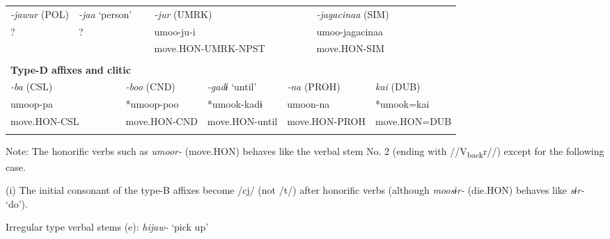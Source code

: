 \begin{tabularx}{\textwidth}{XXXXXXXXXXXXXXXXXXXX}
{ \textit{{}-jawur} (POL)} & \multicolumn{4}{X}{{ \textit{{}-jaa} ‘person’}} & \multicolumn{6}{X}{{ \textit{{}-jur} (UMRK)}} & \multicolumn{9}{X}{{ \textit{{}-jagacinaa} (SIM)}}\\
{ ?} & \multicolumn{4}{X}{?} & \multicolumn{6}{X}{umoo-ju-i} & \multicolumn{9}{X}{{ umoo-jagacinaa}}\\
& \multicolumn{4}{X}{} & \multicolumn{6}{X}{move.HON-UMRK-NPST} & \multicolumn{9}{X}{move.HON-SIM}\\
\multicolumn{20}{X}{}\\
\multicolumn{20}{X}{{\bfseries Type-D affixes and clitic}}\\
\multicolumn{4}{X}{{ \textit{{}-ba} (CSL)}} & \multicolumn{4}{X}{{ \textit{{}-boo} (CND)}} & \multicolumn{2}{X}{{ \textit{{}-gadɨ} ‘until’}} & \multicolumn{3}{X}{{ \textit{{}-na} (PROH)}} & \multicolumn{7}{X}{{ \textit{kai} (DUB)}}\\
\multicolumn{4}{X}{{ umoop-pa}} & \multicolumn{4}{X}{{ *umoop-poo}} & \multicolumn{2}{X}{{ *umook-kadɨ}} & \multicolumn{3}{X}{{ umoon-na}} & \multicolumn{7}{X}{{ *umook=kai}}\\
\multicolumn{4}{X}{move.HON-CSL} & \multicolumn{4}{X}{move.HON-CND} & \multicolumn{2}{X}{move.HON-until} & \multicolumn{3}{X}{move.HON-PROH} & \multicolumn{7}{X}{move.HON=DUB}\\
\lspbottomrule
\end{tabularx}
Note: The honorific verbs such as \textit{umoor-} (move.HON) behaves like the verbal stem No. 2 (ending with //V\textsubscript{back}r//) except for the following case.

(i)  The initial consonant of the type-B affixes become /cj/ (not /t/) after honorific verbs (although \textit{moosɨr-} (die.HON) behaves like \textit{sɨr-} ‘do’).

Irregular type verbal stems (e): \textit{hijaw-} ‘pick up’

\tablefirsthead{}

